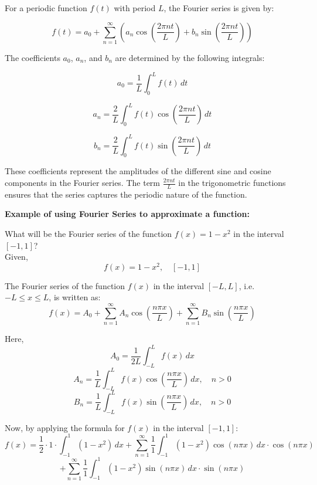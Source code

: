 \documentclass{MathematicaReport}
\begin{document}
For a periodic function \(f(t)\) with period \(L\), the Fourier series is given
by:

\begin{equation*}
f(t) = a_0 + \sum_{n=1}^{\infty} \left( a_n \cos\left(\frac{2\pi nt}{L}\right) + b_n \sin\left(\frac{2\pi nt}{L}\right) \right)
\end{equation*}

The coefficients \(a_0\), \(a_n\), and \(b_n\) are determined by the following integrals:

\begin{equation*}
a_0 = \frac{1}{L} \int_{0}^{L} f(t) \, dt
\end{equation*}

\begin{equation*}
a_n = \frac{2}{L} \int_{0}^{L} f(t) \cos\left(\frac{2\pi nt}{L}\right) \, dt
\end{equation*}

\begin{equation*}
b_n = \frac{2}{L} \int_{0}^{L} f(t) \sin\left(\frac{2\pi nt}{L}\right) \, dt
\end{equation*}

These coefficients represent the amplitudes of the different sine and cosine
components in the Fourier series. The term \(\frac{2\pi nt}{L}\) in the
trigonometric functions ensures that the series captures the periodic nature of
the function.

\textbf{Example of using Fourier Series to approximate a function:}

What will be the Fourier series of the function $f(x)=1-x^2$ in the interval $[-1,1]$? \\

Given,
\[ f(x) = 1 - x^2, \quad [-1, 1] \]

The Fourier series of the function \( f(x) \) in the interval \([-L, L]\), i.e. \(-L \leq x \leq L\), is written as:
\[ f(x) = A_0 + \sum_{n=1}^{\infty} A_n \cos\left(\frac{n\pi x}{L}\right) + \sum_{n=1}^{\infty} B_n \sin\left(\frac{n\pi x}{L}\right) \]

Here,
\[ A_0 = \frac{1}{2L} \int_{-L}^{L} f(x) \,dx \]
\[ A_n = \frac{1}{L} \int_{-L}^{L} f(x) \cos\left(\frac{n\pi x}{L}\right) \,dx, \quad n > 0 \]
\[ B_n = \frac{1}{L} \int_{-L}^{L} f(x) \sin\left(\frac{n\pi x}{L}\right) \,dx, \quad n > 0 \]

Now, by applying the formula for \( f(x) \) in the interval \([-1, 1]\):
\[ f(x) = \frac{1}{2} \cdot 1 \cdot \int_{-1}^{1} (1 - x^2) \,dx + \sum_{n=1}^{\infty} \frac{1}{1} \int_{-1}^{1} (1 - x^2) \cos(n\pi x) \,dx \cdot \cos(n\pi x) \]
\[ + \sum_{n=1}^{\infty} \frac{1}{1} \int_{-1}^{1} (1 - x^2) \sin(n\pi x) \,dx \cdot \sin(n\pi x) \]
\end{document}
